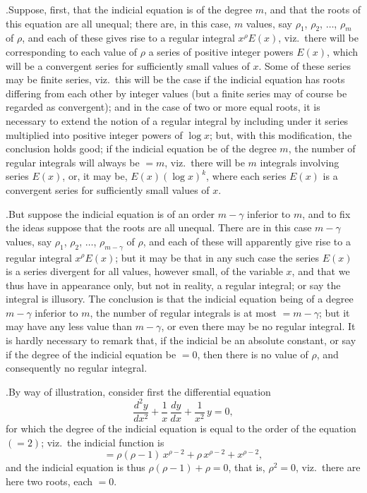 \documentclass[11pt]{article}
\begin{document}
\medskip

.\quad Suppose, first, that the indicial equation is of the degree $m$, and that the roots of this equation are all unequal; there are, in this case, $m$ values, say $\rho_1$, $\rho_2$, $\dotsc$, $\rho_m$ of $\rho$, and each of these gives rise to a regular integral $x^{\rho}E(x)$, viz.\ there will be corresponding to each value of $\rho$ a series of positive integer powers $E(x)$, which will be a convergent series for sufficiently small values of $x$. Some of these series may be finite series, viz.\ this will be the case if the indicial equation has roots differing from each other by integer values (but a finite series may of course be regarded as convergent); and in the case of two or more equal roots, it is necessary to extend the notion of a regular integral by including under it series multiplied into positive integer powers of $\log x$; but, with this modification, the conclusion holds good; if the indicial equation be of the degree $m$, the number of regular integrals will always be $=m$, viz.\ there will be $m$ integrals involving series $E(x)$, or, it may be, $E(x)(\log x)^k$, where each series $E(x)$ is a convergent series for sufficiently small values of $x$.

\medskip

.\quad But suppose the indicial equation is of an order $m-\gamma$ inferior to $m$, and to fix the ideas suppose that the roots are all unequal. There are in this case $m-\gamma$ values, say $\rho_1$, $\rho_2$, $\dotsc$, $\rho_{m-\gamma}$ of $\rho$, and each of these will apparently give rise to a regular integral $x^{\rho}E(x)$; but it may be that in any such case the series $E(x)$ is a series divergent for all values, however small, of the variable $x$, and that we thus have in appearance only, but not in reality, a regular integral; or say the integral is illusory. The conclusion is that the indicial equation being of a degree $m-\gamma$ inferior to $m$, the number of regular integrals is at most $=m-\gamma$; but it may have any less value than $m-\gamma$, or even there may be no regular integral. It is hardly necessary to remark that, if the indicial be an absolute constant, or say if the degree of the indicial equation be $=0$, then there is no value of $\rho$, and consequently no regular integral.

\medskip

.\quad By way of illustration, consider first the differential equation
\[
\frac{d^2y}{dx^2} + \frac{1}{x}\,\frac{dy}{dx} + \frac{1}{x^2}\,y = 0,
\]
for which the degree of the indicial equation is equal to the order of the equation $(=2)$; viz.\ the indicial function is
\[
= \rho(\rho-1)\,x^{\rho-2} + \rho\,x^{\rho-2} + x^{\rho-2},
\]
and the indicial equation is thus $\rho(\rho-1)+\rho = 0$, that is, $\rho^2 = 0$, viz.\ there are here two roots, each $=0$.
\end{document}
